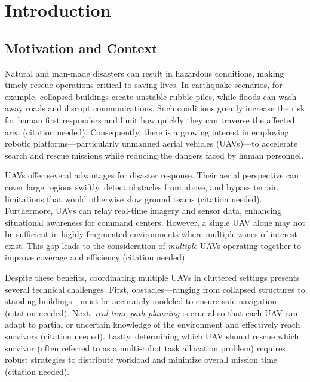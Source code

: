\documentclass[12pt,a4paper]{report}
\begin{document}
  
  \cleardoublepage              %
  \tableofcontents
  \listoffigures                %
  \listoftables                 %
  

\chapter{Introduction}

\section{Motivation and Context}

Natural and man-made disasters can result in hazardous conditions, 
making timely rescue operations critical to saving lives. In earthquake 
scenarios, for example, collapsed buildings create unstable rubble piles, 
while floods can wash away roads and disrupt communications. Such conditions 
greatly increase the risk for human first responders and limit how quickly 
they can traverse the affected area (citation needed). Consequently, 
there is a growing interest in employing robotic platforms—particularly 
unmanned aerial vehicles (UAVs)—to accelerate search and rescue missions 
while reducing the dangers faced by human personnel.

UAVs offer several advantages for disaster response. Their aerial perspective 
can cover large regions swiftly, detect obstacles from above, and bypass terrain 
limitations that would otherwise slow ground teams (citation needed). Furthermore, 
UAVs can relay real-time imagery and sensor data, enhancing situational awareness 
for command centers. However, a single UAV alone may not be sufficient in highly 
fragmented environments where multiple zones of interest exist. This gap leads to 
the consideration of \emph{multiple} UAVs operating together to improve coverage 
and efficiency (citation needed).

Despite these benefits, coordinating multiple UAVs in cluttered settings 
presents several technical challenges. First, obstacles—ranging from collapsed 
structures to standing buildings—must be accurately modeled to ensure safe 
navigation (citation needed). Next, \emph{real-time path planning} is crucial 
so that each UAV can adapt to partial or uncertain knowledge of the environment 
and effectively reach survivors (citation needed). Lastly, determining 
which UAV should rescue which survivor (often referred to as a multi-robot task 
allocation problem) requires robust strategies to distribute workload and minimize 
overall mission time (citation needed). 
\end{document}

